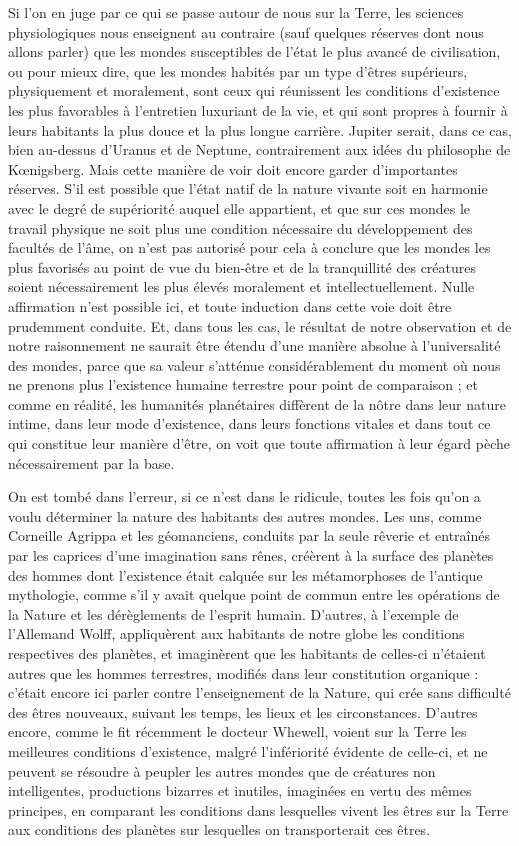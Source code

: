\documentclass[a4paper, 11pt, oneside]{article}
\begin{document}
Si l'on en juge par ce qui se passe autour de nous sur la Terre, les sciences physiologiques nous enseignent au contraire (sauf quelques réserves dont nous allons parler) que les mondes susceptibles de l'état le plus avancé de civilisation, ou pour mieux dire, que les mondes habités par un type d'êtres supérieurs, physiquement et moralement, sont ceux qui réunissent les conditions d'existence les plus favorables à l'entretien luxuriant de la vie, et qui sont propres à fournir à leurs habitants la plus douce et la plus longue carrière. Jupiter serait, dans ce cas, bien au-dessus d'Uranus et de Neptune, contrairement aux idées du philosophe de Kœnigsberg. Mais cette manière de voir doit encore garder d'importantes réserves. S'il est possible que l'état natif de la nature vivante soit en harmonie avec le degré de supériorité auquel elle appartient, et que sur ces mondes le travail physique ne soit plus une condition nécessaire du développement des facultés de l'âme, on n'est pas autorisé pour cela à conclure que les mondes les plus favorisés au point de vue du bien-être et de la tranquillité des créatures soient nécessairement les plus élevés moralement et intellectuellement. Nulle affirmation n'est possible ici, et toute induction dans cette voie doit être prudemment conduite. Et, dans tous les cas, le résultat de notre observation et de notre raisonnement ne saurait être étendu d'une manière absolue à l'universalité des mondes, parce que sa valeur s'atténue considérablement du moment où nous ne prenons plus l'existence humaine terrestre pour point de comparaison ; et comme en réalité, les humanités planétaires diffèrent de la nôtre dans leur nature intime, dans leur mode d'existence, dans leurs fonctions vitales et dans tout ce qui constitue leur manière d'être, on voit que toute affirmation à leur égard pèche nécessairement par la base.

On est tombé dans l'erreur, si ce n'est dans le ridicule, toutes les fois qu'on a voulu déterminer la nature des habitants des autres mondes. Les uns, comme Corneille Agrippa et les géomanciens, conduits par la seule rêverie et entraînés par les caprices d'une imagination sans rênes, créèrent à la surface des planètes des hommes dont l'existence était calquée sur les métamorphoses de l'antique mythologie, comme s'il y avait quelque point de commun entre les opérations de la Nature et les dérèglements de l'esprit humain. D'autres, à l'exemple de l'Allemand Wolff, appliquèrent aux habitants de notre globe les conditions respectives des planètes, et imaginèrent que les habitants de celles-ci n'étaient autres que les hommes terrestres, modifiés dans leur constitution organique : c'était encore ici parler contre l'enseignement de la Nature, qui crée sans difficulté des êtres nouveaux, suivant les temps, les lieux et les circonstances. D'autres encore, comme le fit récemment le docteur Whewell, voient sur la Terre les meilleures conditions d'existence, malgré l'infériorité évidente de celle-ci, et ne peuvent se résoudre à peupler les autres mondes que de créatures non intelligentes, productions bizarres et inutiles, imaginées en vertu des mêmes principes, en comparant les conditions dans lesquelles vivent les êtres sur la Terre aux conditions des planètes sur lesquelles on transporterait ces êtres.
\end{document}
